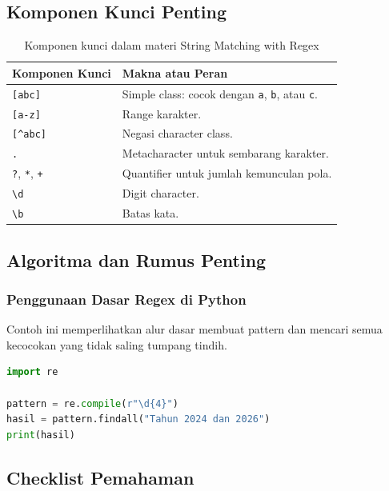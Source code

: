 \subsection{Komponen Kunci Penting}
\begin{table}[H]
\centering
\begin{tabularx}{\textwidth}{|L{0.28\textwidth}|X|}
\hline
\textbf{Komponen Kunci} & \textbf{Makna atau Peran} \\
\hline
\texttt{[abc]} & Simple class: cocok dengan \texttt{a}, \texttt{b}, atau \texttt{c}. \\
\hline
\texttt{[a-z]} & Range karakter. \\
\hline
\texttt{[\^{}abc]} & Negasi character class. \\
\hline
\texttt{.} & Metacharacter untuk sembarang karakter. \\
\hline
\texttt{?}, \texttt{*}, \texttt{+} & Quantifier untuk jumlah kemunculan pola. \\
\hline
\texttt{\textbackslash d} & Digit character. \\
\hline
\texttt{\textbackslash b} & Batas kata. \\
\hline
\end{tabularx}
\caption{Komponen kunci dalam materi String Matching with Regex}
\label{tab:komponen-kunci-regex}
\end{table}

\subsection{Algoritma dan Rumus Penting}
\subsubsection{Penggunaan Dasar Regex di Python}
\begin{jawab}
Contoh ini memperlihatkan alur dasar membuat pattern dan mencari semua kecocokan yang tidak saling tumpang tindih.
\end{jawab}

\begin{lstlisting}[language=Python, caption={Penggunaan dasar regex di Python}, label={lst:regex-python}]
import re

pattern = re.compile(r"\d{4}")
hasil = pattern.findall("Tahun 2024 dan 2026")
print(hasil)
\end{lstlisting}

\subsection{Checklist Pemahaman}
